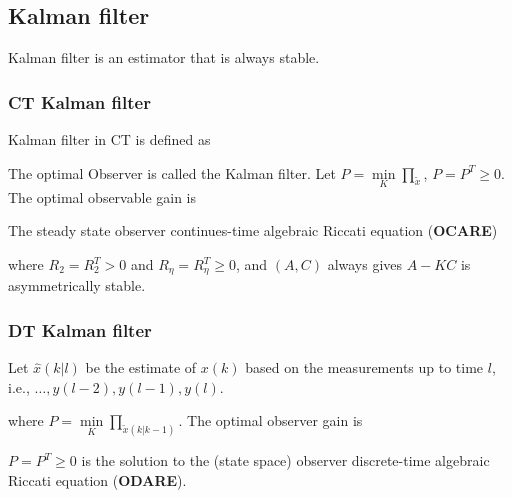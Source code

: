 \begin{multicols}{2}
\subsection{Kalman filter}
Kalman filter is an estimator that is always stable.

\subsubsection{CT Kalman filter}
Kalman filter in CT is defined as

The optimal Observer is called the Kalman filter.
Let $P = \min\limits_{K}\prod_{\tilde{x}}$, $P=P^T\geq0$. The optimal observable gain is 

The steady state observer continues-time algebraic Riccati equation (\textbf{OCARE})

where $R_2=R_2^T > 0$ and $R_{\eta} = R_{\eta}^T \geq0$, and $(A, C)$
always gives $A-KC$ is asymmetrically stable.


\subsubsection{DT Kalman filter}
Let $\hat{x}(k|l)$ be the estimate of $x(k)$ based on the measurements 
up to time $l$, i.e., $\ldots, y(l-2), y(l-1), y(l)$.

where $P=\min\limits_{K}\prod_{\tilde{x}(k|k-1)}$.
The optimal observer gain is

$P = P^T \geq 0$ is the solution to the (state space) 
observer discrete-time algebraic Riccati equation (\textbf{ODARE}).



\end{multicols}
